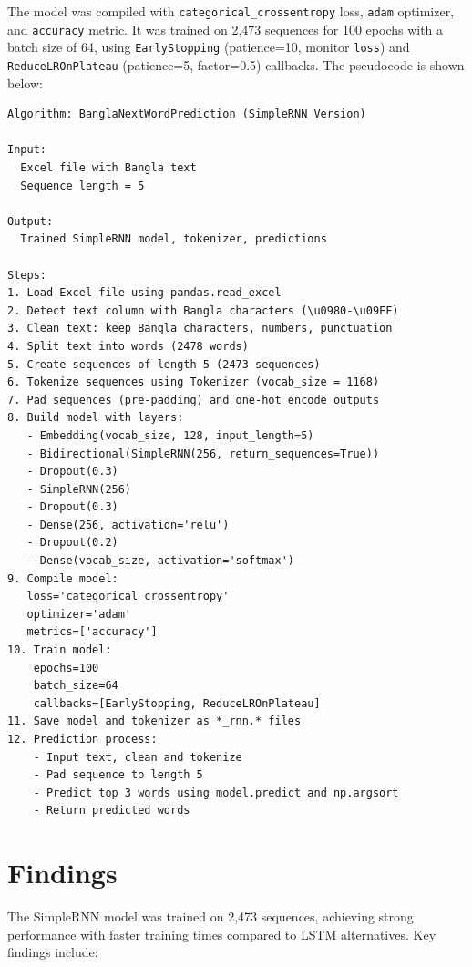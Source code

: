 \documentclass[12pt]{article}
\begin{document}
The model was compiled with \texttt{categorical\_crossentropy} loss, \texttt{adam} optimizer, and \texttt{accuracy} metric. It was trained on 2,473 sequences for 100 epochs with a batch size of 64, using \texttt{EarlyStopping} (patience=10, monitor \texttt{loss}) and \texttt{ReduceLROnPlateau} (patience=5, factor=0.5) callbacks. The pseudocode is shown below:

\begin{lstlisting}
Algorithm: BanglaNextWordPrediction (SimpleRNN Version)

Input: 
  Excel file with Bangla text
  Sequence length = 5

Output: 
  Trained SimpleRNN model, tokenizer, predictions

Steps:
1. Load Excel file using pandas.read_excel
2. Detect text column with Bangla characters (\u0980-\u09FF)
3. Clean text: keep Bangla characters, numbers, punctuation
4. Split text into words (2478 words)
5. Create sequences of length 5 (2473 sequences)
6. Tokenize sequences using Tokenizer (vocab_size = 1168)
7. Pad sequences (pre-padding) and one-hot encode outputs
8. Build model with layers:
   - Embedding(vocab_size, 128, input_length=5)
   - Bidirectional(SimpleRNN(256, return_sequences=True))
   - Dropout(0.3)
   - SimpleRNN(256)
   - Dropout(0.3)
   - Dense(256, activation='relu')
   - Dropout(0.2)
   - Dense(vocab_size, activation='softmax')
9. Compile model: 
   loss='categorical_crossentropy'
   optimizer='adam'
   metrics=['accuracy']
10. Train model: 
    epochs=100
    batch_size=64
    callbacks=[EarlyStopping, ReduceLROnPlateau]
11. Save model and tokenizer as *_rnn.* files
12. Prediction process:
    - Input text, clean and tokenize
    - Pad sequence to length 5
    - Predict top 3 words using model.predict and np.argsort
    - Return predicted words
\end{lstlisting}

\section*{Findings}
The SimpleRNN model was trained on 2,473 sequences, achieving strong performance with faster training times compared to LSTM alternatives. Key findings include:
\end{document}
